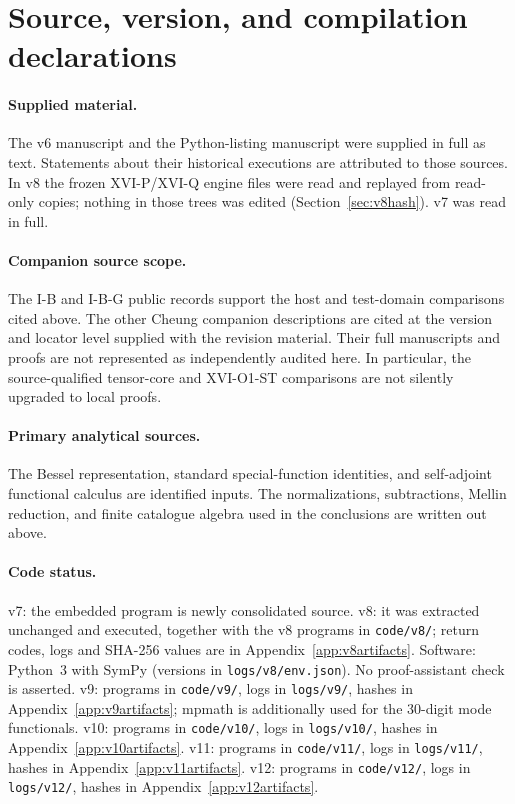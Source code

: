 \documentclass[11pt,a4paper]{article}
\newcommand{\loc}[1]{\nolinkurl{#1}}
\theoremstyle{plain}
\theoremstyle{definition}
\theoremstyle{remark}
\numberwithin{equation}{section}
\begin{document}
\section{Source, version, and compilation declarations}
\label{app:declarations}

\paragraph{Supplied material.}
The v6 manuscript and the Python-listing manuscript were supplied
in full as text. Statements about their historical executions
are attributed to those sources.
In v8 the frozen XVI-P/XVI-Q engine files were read and replayed
from read-only copies; nothing in those trees was edited
(Section~\ref{sec:v8hash}). v7 was read in full.

\paragraph{Companion source scope.}
The I-B and I-B-G public records support the host and test-domain
comparisons cited above. The other Cheung companion descriptions
are cited at the version and locator level supplied with the
revision material. Their full manuscripts and proofs are not
represented as independently audited here.
In particular, the source-qualified tensor-core and
XVI-O1-ST comparisons are not silently upgraded to local proofs.

\paragraph{Primary analytical sources.}
The Bessel representation, standard special-function identities,
and self-adjoint functional calculus are identified inputs.
The normalizations, subtractions, Mellin reduction, and finite
catalogue algebra used in the conclusions are written out above.

\paragraph{Code status.}
v7: the embedded program is newly consolidated source.
v8: it was extracted unchanged and executed, together with the
v8 programs in \loc{code/v8/}; return codes, logs and SHA-256 values
are in Appendix~\ref{app:v8artifacts}. Software: Python~3 with SymPy
(versions in \loc{logs/v8/env.json}). No proof-assistant check is
asserted.
v9: programs in \loc{code/v9/}, logs in \loc{logs/v9/}, hashes in
Appendix~\ref{app:v9artifacts}; mpmath is additionally used for the
30-digit mode functionals.
v10: programs in \loc{code/v10/}, logs in \loc{logs/v10/}, hashes in
Appendix~\ref{app:v10artifacts}.
v11: programs in \loc{code/v11/}, logs in \loc{logs/v11/}, hashes in
Appendix~\ref{app:v11artifacts}.
v12: programs in \loc{code/v12/}, logs in \loc{logs/v12/}, hashes in
Appendix~\ref{app:v12artifacts}.
\end{document}
